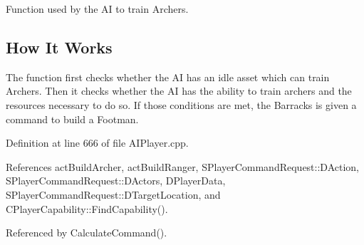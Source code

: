 Function used by the AI to train Archers. 

\hypertarget{classCAIPlayer_tfhow_sec}{}\subsection{How It Works}\label{classCAIPlayer_tfhow_sec}
The function first checks whether the AI has an idle asset which can train Archers. Then it checks whether the AI has the ability to train archers and the resources necessary to do so. If those conditions are met, the Barracks is given a command to build a Footman. 

Definition at line 666 of file A\+I\+Player.\+cpp.



References act\+Build\+Archer, act\+Build\+Ranger, S\+Player\+Command\+Request\+::\+D\+Action, S\+Player\+Command\+Request\+::\+D\+Actors, D\+Player\+Data, S\+Player\+Command\+Request\+::\+D\+Target\+Location, and C\+Player\+Capability\+::\+Find\+Capability().



Referenced by Calculate\+Command().


